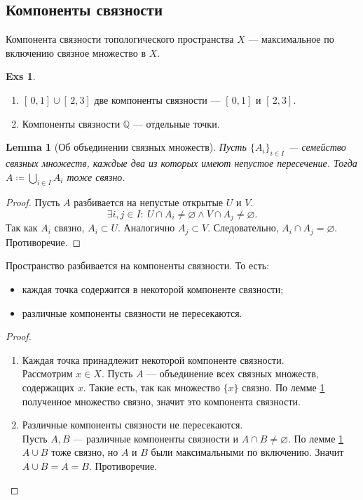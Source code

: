 \documentclass[11pt]{book}
\newcommand{\Q}{\mathbb{Q}}
\theoremstyle{definition}
\theoremstyle{plain}
\theoremstyle{plain}
\newtheorem*{lm}{Lemma}
\theoremstyle{definition}
\newtheorem*{exs}{Exs}
\theoremstyle{remark}
\begin{document}
\subsection{Компоненты связности}
\begin{defn}
    {\sf Компонента связности} топологического пространства $ X$ ---  максимальное по включению связное множество в $ X$.
\end{defn}
\begin{exs}
    $ $
    \begin{enumerate}
	\item $ [\,0,1]\cup [\,2, 3]$ две компоненты связности --- $ [\,0,1]$ и  $ [\,2, 3]$.
	\item Компоненты связности  $ \Q$ --- отдельные точки.
    \end{enumerate}
\end{exs}
\begin{lm}[Об объединении связных множеств]\label{lm_subset}
    Пусть $ \{A_i\}_{i \in  I}$ --- семейство связных множеств, каждые два из которых имеют непустое пересечение. Тогда $
    A \coloneqq \bigcup_{i \in  I} A_i
    $ тоже связно.
\end{lm}
\begin{proof}
    Пусть $ A$ разбивается на непустые открытые $ U$   и $ V$.
    \[
	\exists i, j \in  I: ~ U \cap A_i \ne \varnothing \wedge V \cap A_j \ne  \varnothing
    .\]
    Так как $ A_i$ связно, $ A_i \subset U$. Аналогично $ A_j \subset V$. Следовательно, $ A_i \cap A_j = \varnothing$. Противоречие.
\end{proof}
\begin{thm}
    Пространство разбивается на компоненты связности. То есть:
    \begin{itemize}[noitemsep]
	\item  каждая точка содержится в некоторой компоненте связности;
	\item различные компоненты связности не пересекаются.
    \end{itemize}
\end{thm}
\begin{proof}
    $ $
    \begin{enumerate}
	\item Каждая точка принадлежит некоторой компоненте связности. \\
	    Рассмотрим $ x \in X$. Пусть $ A$ --- объединение всех связных множеств, содержащих  $ x$. Такие есть, так как множество  $ \{x\}$ связно. По лемме \ref{lm_subset} полученное множество связно, значит это компонента связности.
	\item Различные компоненты связности не пересекаются.\\
	    Пусть $ A, B$ --- различные компоненты связности и  $ A \cap B \ne \varnothing$. По лемме \ref{lm_subset} $ A \cup B$ тоже связно, но $ A$ и  $ B$ были максимальными по включению. Значит  $ A \cup B = A = B$. Противоречие.
    \end{enumerate}
\end{proof}
\end{document}
